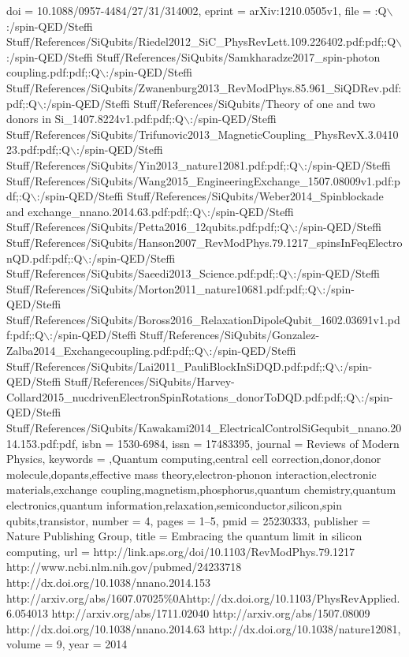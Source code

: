 {doi = {10.1088/0957-4484/27/31/314002},
eprint = {arXiv:1210.0505v1},
file = {:Q$\backslash$:/spin-QED/Steffi Stuff/References/SiQubits/Riedel2012{\_}SiC{\_}PhysRevLett.109.226402.pdf:pdf;:Q$\backslash$:/spin-QED/Steffi Stuff/References/SiQubits/Samkharadze2017{\_}spin-photon coupling.pdf:pdf;:Q$\backslash$:/spin-QED/Steffi Stuff/References/SiQubits/Zwanenburg2013{\_}RevModPhys.85.961{\_}SiQDRev.pdf:pdf;:Q$\backslash$:/spin-QED/Steffi Stuff/References/SiQubits/Theory of one and two donors in Si{\_}1407.8224v1.pdf:pdf;:Q$\backslash$:/spin-QED/Steffi Stuff/References/SiQubits/Trifunovic2013{\_}MagneticCoupling{\_}PhysRevX.3.041023.pdf:pdf;:Q$\backslash$:/spin-QED/Steffi Stuff/References/SiQubits/Yin2013{\_}nature12081.pdf:pdf;:Q$\backslash$:/spin-QED/Steffi Stuff/References/SiQubits/Wang2015{\_}EngineeringExchange{\_}1507.08009v1.pdf:pdf;:Q$\backslash$:/spin-QED/Steffi Stuff/References/SiQubits/Weber2014{\_}Spinblockade and exchange{\_}nnano.2014.63.pdf:pdf;:Q$\backslash$:/spin-QED/Steffi Stuff/References/SiQubits/Petta2016{\_}12qubits.pdf:pdf;:Q$\backslash$:/spin-QED/Steffi Stuff/References/SiQubits/Hanson2007{\_}RevModPhys.79.1217{\_}spinsInFeqElectronQD.pdf:pdf;:Q$\backslash$:/spin-QED/Steffi Stuff/References/SiQubits/Saeedi2013{\_}Science.pdf:pdf;:Q$\backslash$:/spin-QED/Steffi Stuff/References/SiQubits/Morton2011{\_}nature10681.pdf:pdf;:Q$\backslash$:/spin-QED/Steffi Stuff/References/SiQubits/Boross2016{\_}RelaxationDipoleQubit{\_}1602.03691v1.pdf:pdf;:Q$\backslash$:/spin-QED/Steffi Stuff/References/SiQubits/Gonzalez-Zalba2014{\_}Exchangecoupling.pdf:pdf;:Q$\backslash$:/spin-QED/Steffi Stuff/References/SiQubits/Lai2011{\_}PauliBlockInSiDQD.pdf:pdf;:Q$\backslash$:/spin-QED/Steffi Stuff/References/SiQubits/Harvey-Collard2015{\_}nucdrivenElectronSpinRotations{\_}donorToDQD.pdf:pdf;:Q$\backslash$:/spin-QED/Steffi Stuff/References/SiQubits/Kawakami2014{\_}ElectricalControlSiGequbit{\_}nnano.2014.153.pdf:pdf},
isbn = {1530-6984},
issn = {17483395},
journal = {Reviews of Modern Physics},
keywords = {,Quantum computing,central cell correction,donor,donor molecule,dopants,effective mass theory,electron-phonon interaction,electronic materials,exchange coupling,magnetism,phosphorus,quantum chemistry,quantum electronics,quantum information,relaxation,semiconductor,silicon,spin qubits,transistor},
number = {4},
pages = {1--5},
pmid = {25230333},
publisher = {Nature Publishing Group},
title = {{Embracing the quantum limit in silicon computing}},
url = {http://link.aps.org/doi/10.1103/RevModPhys.79.1217 http://www.ncbi.nlm.nih.gov/pubmed/24233718 http://dx.doi.org/10.1038/nnano.2014.153 http://arxiv.org/abs/1607.07025{\%}0Ahttp://dx.doi.org/10.1103/PhysRevApplied.6.054013 http://arxiv.org/abs/1711.02040 http://arxiv.org/abs/1507.08009 http://dx.doi.org/10.1038/nnano.2014.63 http://dx.doi.org/10.1038/nature12081},
volume = {9},
year = {2014}
}

